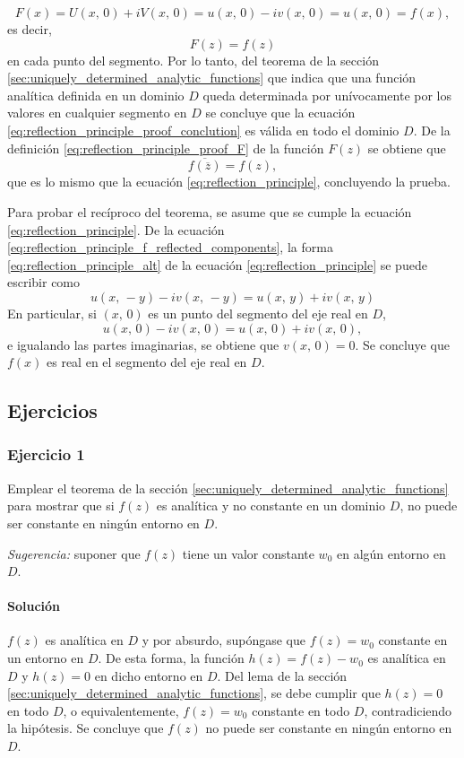 \documentclass[a4paper]{report}
\begin{document}
\[
 F(x)=U(x,\,0)+iV(x,\,0)=u(x,\,0)-iv(x,\,0)=u(x,\,0)=f(x),
\]
es decir,
\begin{equation}\label{eq:reflection_principle_proof_conclution}
 F(z)=f(z)
\end{equation}
en cada punto del segmento. Por lo tanto, del teorema de la sección \ref{sec:uniquely_determined_analytic_functions} que indica que una función analítica definida en un dominio \(D\) queda determinada por unívocamente por los valores en cualquier segmento en \(D\) se concluye que la ecuación \ref{eq:reflection_principle_proof_conclution} es válida en todo el dominio \(D\). De la definición \ref{eq:reflection_principle_proof_F} de la función \(F(z)\) se obtiene que 
\begin{equation}\label{eq:reflection_principle_alt}
 \overline{f(\overline{z})}=f(z), 
\end{equation}
que es lo mismo que la ecuación \ref{eq:reflection_principle}, concluyendo la prueba.

Para probar el recíproco del teorema, se asume que se cumple la ecuación \ref{eq:reflection_principle}. De la ecuación \ref{eq:reflection_principle_f_reflected_components}, la forma \ref{eq:reflection_principle_alt} de la ecuación \ref{eq:reflection_principle} se puede escribir como 
\[
 u(x,\,-y)-iv(x,\,-y)=u(x,\,y)+iv(x,\,y)
\]
En particular, si \((x,\,0)\) es un punto del segmento del eje real en \(D\),
\[
 u(x,\,0)-iv(x,\,0)=u(x,\,0)+iv(x,\,0),
\]
e igualando las partes imaginarias, se obtiene que \(v(x,\,0)=0\). Se concluye que \(f(x)\) es real en el segmento del eje real en \(D\). 

\subsection*{Ejercicios}

\subsubsection{Ejercicio 1}

Emplear el teorema de la sección \ref{sec:uniquely_determined_analytic_functions} para mostrar que si  \(f(z)\) es analítica y no constante en un dominio \(D\), no puede ser constante en ningún entorno en \(D\).

\emph{Sugerencia:} suponer que \(f(z)\) tiene un valor constante \(w_0\) en algún entorno en \(D\).

\paragraph{Solución} \(f(z)\) es analítica en \(D\) y por absurdo, supóngase que \(f(z)=w_0\) constante en un entorno en \(D\). De esta forma, la función \(h(z)=f(z)-w_0\) es analítica en \(D\) y \(h(z)=0\) en dicho entorno en \(D\). Del lema de la sección \ref{sec:uniquely_determined_analytic_functions}, se debe  cumplir que \(h(z)=0\) en todo \(D\), o equivalentemente, \(f(z)=w_0\) constante en todo \(D\), contradiciendo la hipótesis. Se concluye que \(f(z)\) no puede ser constante en ningún entorno en \(D\).
\end{document}
